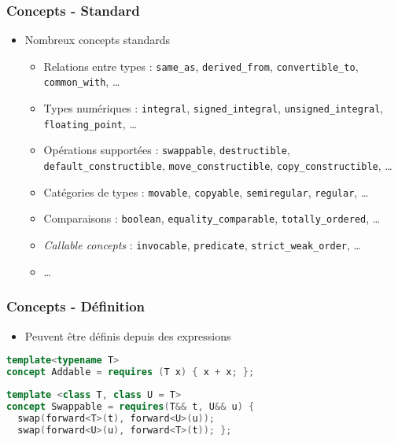 \documentclass[C++.tex]{subfiles}
\begin{document}
\begin{frame}[fragile]
	\frametitle{Concepts - Standard}
	\begin{itemize}
		\item Nombreux concepts standards
		\begin{itemize}
			\item Relations entre types : \lstinline|same_as|, \lstinline|derived_from|, \lstinline|convertible_to|, \lstinline|common_with|, \ldots{}
			\item Types numériques : \lstinline|integral|, \lstinline|signed_integral|, \lstinline|unsigned_integral|, \lstinline|floating_point|, \ldots{}
			\item Opérations supportées : \lstinline|swappable|, \lstinline|destructible|, \lstinline|default_constructible|, \lstinline|move_constructible|, \lstinline|copy_constructible|, \ldots{}
			\item Catégories de types : \lstinline|movable|, \lstinline|copyable|, \lstinline|semiregular|, \lstinline|regular|, \ldots{}


			\item Comparaisons : \lstinline|boolean|, \lstinline|equality_comparable|, \lstinline|totally_ordered|, \ldots{}
			\item \textit{Callable concepts} : \lstinline|invocable|, \lstinline|predicate|, \lstinline|strict_weak_order|, \ldots{}


			\item \ldots{}
		\end{itemize}
	\end{itemize}
\end{frame}

\begin{frame}[fragile]
	\frametitle{Concepts - Définition}
	\begin{itemize}
		\item Peuvent être définis depuis des expressions
	\end{itemize}

	\begin{lstlisting}[language=C++]
template<typename T>
concept Addable = requires (T x) { x + x; };\end{lstlisting}

	\begin{lstlisting}[language=C++]
template <class T, class U = T>
concept Swappable = requires(T&& t, U&& u) {
  swap(forward<T>(t), forward<U>(u));
  swap(forward<U>(u), forward<T>(t)); };\end{lstlisting}
\end{frame}
\end{document}
